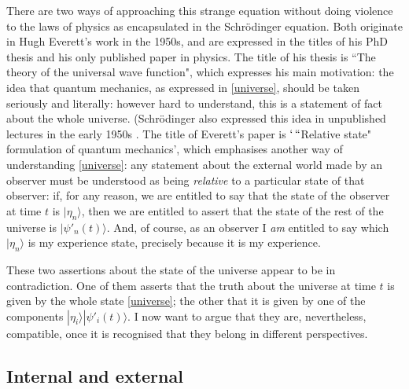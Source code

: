 \documentclass[12pt,a4paper,reqno]{article}
\renewcommand{\(}{\left(}
\renewcommand{\)}{\right)}
\newcommand{\<}{\langle}
\renewcommand{\>}{\rangle}
\theoremstyle{plain} %
\begin{document}
There are two ways of approaching this strange equation without doing violence to the laws of physics as encapsulated in the Schr\"odinger equation. Both originate in Hugh Everett's work in the 1950s, and are expressed in the titles of his PhD thesis and his only published paper in physics. The title of his thesis is ``The theory of the universal wave function", which expresses his main motivation: the idea that quantum mechanics, as expressed in \eqref{universe}, should be taken seriously and literally: however hard to understand, this is a statement of fact about the whole universe. (Schr\"odinger also expressed this idea in unpublished lectures in the early 1950s \cite{Schrodinger:interpretns}. The title of Everett's paper is $`\,``$Relative state" formulation of quantum mechanics', which emphasises another way of understanding \eqref{universe}: any statement about the external world made by an observer must be understood as being \emph{relative} to a particular state of that observer: if, for any reason, we are entitled to say that the state of the observer at time $t$ is $|\eta_n\>$, then we are entitled to assert that the state of the rest of the universe is $|\psi'_n(t)\>$. And, of course, as an observer I \emph{am} entitled to say which $|\eta_n\>$ is my experience state, precisely because it is my experience.

These two assertions about the state of the universe appear to be in contradiction. One of them asserts that the truth about the universe at time $t$ is given by the whole state \eqref{universe}; the other that it is given by one of the components $|\eta_i\>|\psi'_i(t)\>$. I now want to argue that they are, nevertheless, compatible, once it is recognised that they belong in different perspectives.
 


\subsection{Internal and external}
\label{susec:intext}
\end{document}
